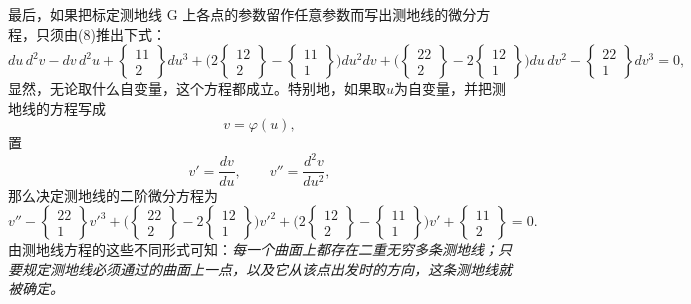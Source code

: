 最后，如果把标定测地线 G 上各点的参数留作任意参数而写出测地线的微分方程，只须由(8)推出下式：
\begin{equation}\tag{10}
 du\,d^2v-dv\,d^2u+\begin{Bmatrix}11\\2\end{Bmatrix}du^3+\biggl(2\begin{Bmatrix}12\\2\end{Bmatrix}-\begin{Bmatrix}11\\1\end{Bmatrix}\biggr)du^2dv
+\biggl(\begin{Bmatrix}22\\2\end{Bmatrix}-2\begin{Bmatrix}12\\1\end{Bmatrix}\biggr)du\,dv^2-\begin{Bmatrix}22\\1\end{Bmatrix}dv^3=0,
\end{equation}
显然，无论取什么自变量，这个方程都成立。特别地，如果取\(u\)为自变量，并把测地线的方程写成
\[
 v=\varphi(u),
\]
置
\[
 v'=\frac{dv}{du},
 \qquad
 v''=\frac{d^2v}{du^2},
\]
那么决定测地线的二阶微分方程为
\begin{equation}\tag{10*}
 v''-\begin{Bmatrix}22\\1\end{Bmatrix}v'^3+\biggl(\begin{Bmatrix}22\\2\end{Bmatrix}-2\begin{Bmatrix}12\\1\end{Bmatrix}\biggr)v'^2+\biggl(2\begin{Bmatrix}12\\2\end{Bmatrix}-\begin{Bmatrix}11\\1\end{Bmatrix}\biggr)v'+\begin{Bmatrix}11\\2\end{Bmatrix}=0.
\end{equation}
由测地线方程的这些不同形式可知：\emph{每一个曲面上都存在二重无穷多条测地线；只要规定测地线必须通过的曲面上一点，以及它从该点出发时的方向，这条测地线就被确定。}

